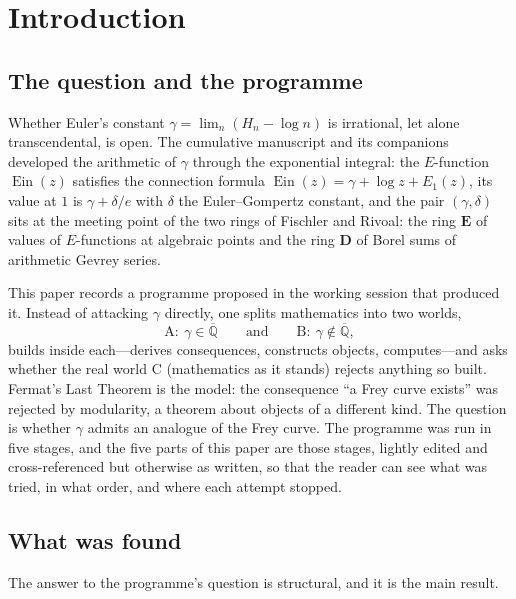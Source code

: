 \documentclass[11pt,a4paper]{article}
\newcommand{\Qbar}{\overline{\mathbb Q}}
\newcommand{\Ein}{\operatorname{Ein}}
\newcommand{\EE}{\mathbf E}
\newcommand{\DD}{\mathbf D}
\theoremstyle{definition}
\theoremstyle{remark}
\numberwithin{equation}{section}
\begin{document}
\tableofcontents

\section{Introduction}\label{sec:introduction}

\subsection{The question and the programme}

Whether Euler's constant $\gamma=\lim_n(H_n-\log n)$ is irrational, let alone
transcendental, is open. The cumulative manuscript \cite{M} and its companions
\cite{K001,K002} developed the arithmetic of $\gamma$ through the exponential integral:
the $E$-function $\Ein(z)$ satisfies the connection formula
$\Ein(z)=\gamma+\log z+E_1(z)$, its value at $1$ is $\gamma+\delta/e$ with $\delta$ the
Euler--Gompertz constant, and the pair $(\gamma,\delta)$ sits at the meeting point of the
two rings of Fischler and Rivoal: the ring $\EE$ of values of $E$-functions at algebraic
points and the ring $\DD$ of Borel sums of arithmetic Gevrey series.

This paper records a programme proposed in the working session that produced it. Instead
of attacking $\gamma$ directly, one splits mathematics into two worlds,
\[
 \mathrm A:\ \gamma\in\Qbar\qquad\text{and}\qquad\mathrm B:\ \gamma\notin\Qbar ,
\]
builds inside each---derives consequences, constructs objects, computes---and asks
whether the real world $\mathrm C$ (mathematics as it stands) rejects anything so built.
Fermat's Last Theorem is the model: the consequence ``a Frey curve exists'' was rejected by
modularity, a theorem about objects of a different kind. The question is whether $\gamma$
admits an analogue of the Frey curve. The programme was run in five stages, and the five
parts of this paper are those stages, lightly edited and cross-referenced but otherwise as
written, so that the reader can see what was tried, in what order, and where each attempt
stopped.

\subsection{What was found}

The answer to the programme's question is structural, and it is the main result.
\end{document}
